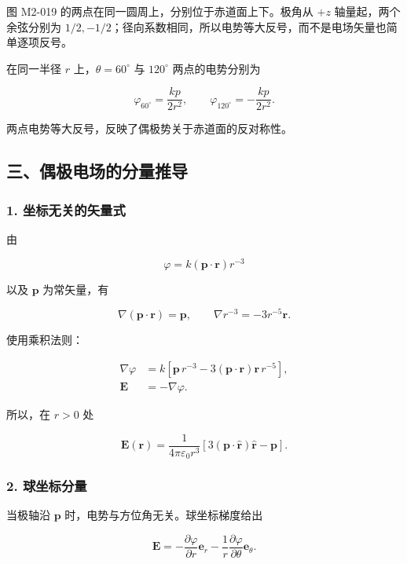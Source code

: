 图 M2-019 的两点在同一圆周上，分别位于赤道面上下。极角从 \(+z\)
轴量起，两个余弦分别为
\(1/2,-1/2\)；径向系数相同，所以电势等大反号，而不是电场矢量也简单逐项反号。

在同一半径 \(r\) 上，\(\theta=60^{\circ}\) 与 \(120^{\circ}\)
两点的电势分别为

\[
\varphi_{60^{\circ}}=\frac{kp}{2r^2},
\qquad
\varphi_{120^{\circ}}=-\frac{kp}{2r^2}.
\]

两点电势等大反号，反映了偶极势关于赤道面的反对称性。

\subsection{三、偶极电场的分量推导}\label{m2:ux4e09ux5076ux6781ux7535ux573aux7684ux5206ux91cfux63a8ux5bfc}

\subsubsection{1.
坐标无关的矢量式}\label{m2:ux5750ux6807ux65e0ux5173ux7684ux77e2ux91cfux5f0f}

由

\[
\varphi=k(\mathbf p\cdot\mathbf r)r^{-3}
\]

以及 \(\mathbf p\) 为常矢量，有

\[
\nabla(\mathbf p\cdot\mathbf r)=\mathbf p,
\qquad
\nabla r^{-3}=-3r^{-5}\mathbf r.
\]

使用乘积法则：

\[
\begin{aligned}
\nabla\varphi
&=k\left[
\mathbf p\,r^{-3}
-3(\mathbf p\cdot\mathbf r)\mathbf r\,r^{-5}
\right],\\
\mathbf E
&=-\nabla\varphi.
\end{aligned}
\]

所以，在 \(r>0\) 处

\[
\boxed{
\mathbf E(\mathbf r)
=\frac1{4\pi\varepsilon_0r^3}
\left[3(\mathbf p\cdot\hat{\mathbf r})\hat{\mathbf r}-\mathbf p\right]
}.
\]

\subsubsection{2. 球坐标分量}\label{m2:ux7403ux5750ux6807ux5206ux91cf}

当极轴沿 \(\mathbf p\) 时，电势与方位角无关。球坐标梯度给出

\[
\mathbf E
=-\frac{\partial\varphi}{\partial r}\mathbf e_r
-\frac1r\frac{\partial\varphi}{\partial\theta}\mathbf e_{\theta}.
\]

